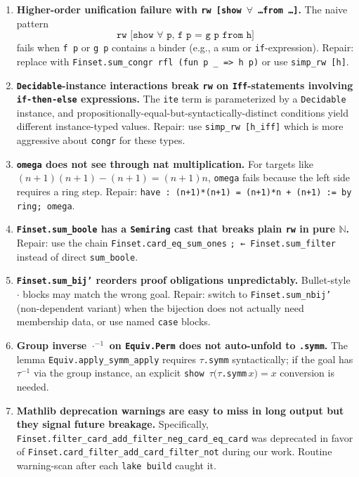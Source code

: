 \documentclass[11pt]{article}
\theoremstyle{definition}
\begin{document}
\begin{enumerate}
    \item \textbf{Higher-order unification failure with \texttt{rw [show $\forall$
    \ldots from \ldots]}.} The naive pattern
    \[
        \texttt{rw [show $\forall$ p, f p = g p from h]}
    \]
    fails when \texttt{f p} or \texttt{g p} contains a binder (e.g., a sum or
    \texttt{if}-expression). Repair: replace with
    \texttt{Finset.sum\_congr rfl (fun p \_ => h p)} or use \texttt{simp\_rw [h]}.

    \item \textbf{\texttt{Decidable}-instance interactions break \texttt{rw} on
    \texttt{Iff}-statements involving \texttt{if-then-else} expressions.} The
    \texttt{ite} term is parameterized by a \texttt{Decidable} instance, and
    propositionally-equal-but-syntactically-distinct conditions yield different
    instance-typed values. Repair: use \texttt{simp\_rw [h\_iff]} which is more
    aggressive about \texttt{congr} for these types.

    \item \textbf{\texttt{omega} does not see through nat multiplication.} For
    targets like $(n+1)(n+1) - (n+1) = (n+1)n$, \texttt{omega} fails because the
    left side requires a ring step. Repair: \texttt{have : (n+1)*(n+1) = (n+1)*n
    + (n+1) := by ring; omega}.

    \item \textbf{\texttt{Finset.sum\_boole} has a \texttt{Semiring} cast that
    breaks plain \texttt{rw} in pure $\mathbb{N}$.} Repair: use the chain
    \texttt{Finset.card\_eq\_sum\_ones} \texttt{; ← Finset.sum\_filter} instead of
    direct \texttt{sum\_boole}.

    \item \textbf{\texttt{Finset.sum\_bij'} reorders proof obligations
    unpredictably.} Bullet-style \texttt{$\cdot$} blocks may match the wrong goal.
    Repair: switch to \texttt{Finset.sum\_nbij'} (non-dependent variant) when the
    bijection does not actually need membership data, or use named \texttt{case}
    blocks.

    \item \textbf{Group inverse \texttt{$\cdot^{-1}$} on \texttt{Equiv.Perm} does
    not auto-unfold to \texttt{.symm}.} The lemma \texttt{Equiv.apply\_symm\_apply}
    requires \texttt{$\tau$.symm} syntactically; if the goal has \texttt{$\tau^{-1}$}
    via the group instance, an explicit \texttt{show $\tau (\tau$.symm$\, x) = x$}
    conversion is needed.

    \item \textbf{Mathlib deprecation warnings are easy to miss in long output but
    they signal future breakage.} Specifically,
    \texttt{Finset.filter\_card\_add\_filter\_neg\_card\_eq\_card} was deprecated
    in favor of \texttt{Finset.card\_filter\_add\_card\_filter\_not} during our
    work. Routine warning-scan after each \texttt{lake build} caught it.
\end{enumerate}
\end{document}
